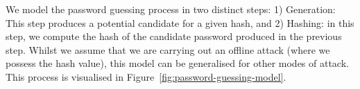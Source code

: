 We model the password guessing process in two distinct steps: 1) Generation: This step produces a potential candidate for a given hash, and 2) Hashing: in this step, we compute the hash of the candidate password produced in the previous step. Whilst we assume that we are carrying out an offline attack (where we possess the hash value), this model can be generalised for other modes of attack. This process is visualised in Figure~\ref{fig:password-guessing-model}.

% 


%
%
%
%
%


